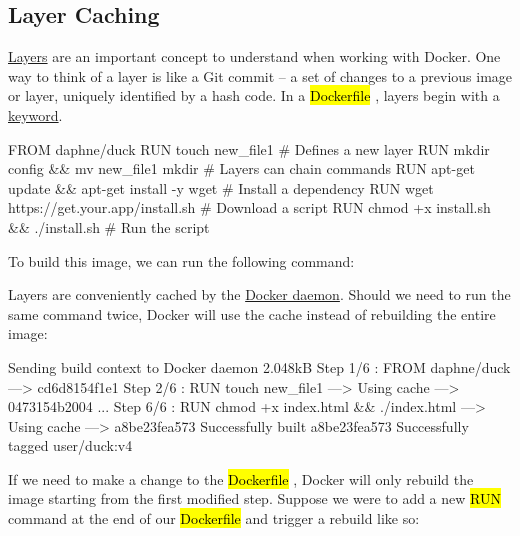 \documentclass[12pt,initial,twoside,maitrise]{dms}
\newcommand{\inline}[1]{%
    \begingroup%
    \sethlcolor{slightgray}%
    \hl{\ttfamily\small #1}%
    \endgroup
}
\numberwithin{equation}{section}
\numberwithin{table}{chapter}
\numberwithin{figure}{chapter}
\begin{document}
\subsection{Layer Caching}

\href{https://docs.docker.com/storage/storagedriver/#images-and-layers}{Layers} are an important concept to understand when working with Docker. One way to think of a layer is like a Git commit -- a set of changes to a previous image or layer, uniquely identified by a hash code. In a \inline{Dockerfile}, layers begin with a \href{https://docs.docker.com/engine/reference/builder/#from}{keyword}.

\begin{dockerlisting}
FROM daphne/duck
RUN touch new_file1                            # Defines a new layer
RUN mkdir config && mv new_file1 mkdir         # Layers can chain commands
RUN apt-get update && apt-get install -y wget  # Install a dependency
RUN wget https://get.your.app/install.sh       # Download a script
RUN chmod +x install.sh && ./install.sh        # Run the script
\end{dockerlisting}
%
To build this image, we can run the following command:

%
Layers are conveniently cached by the \href{https://docs.docker.com/engine/reference/commandline/dockerd/}{Docker daemon}. Should we need to run the same command twice, Docker will use the cache instead of rebuilding the entire image:

\begin{pclisting}
Sending build context to Docker daemon  2.048kB
Step 1/6 : FROM daphne/duck
---> cd6d8154f1e1
Step 2/6 : RUN touch new_file1
---> Using cache
---> 0473154b2004
...
Step 6/6 : RUN chmod +x index.html && ./index.html
---> Using cache
---> a8be23fea573
Successfully built a8be23fea573
Successfully tagged user/duck:v4
\end{pclisting}
%
If we need to make a change to the \inline{Dockerfile}, Docker will only rebuild the image starting from the first modified step. Suppose we were to add a new \inline{RUN} command at the end of our \inline{Dockerfile} and trigger a rebuild like so:
\end{document}

